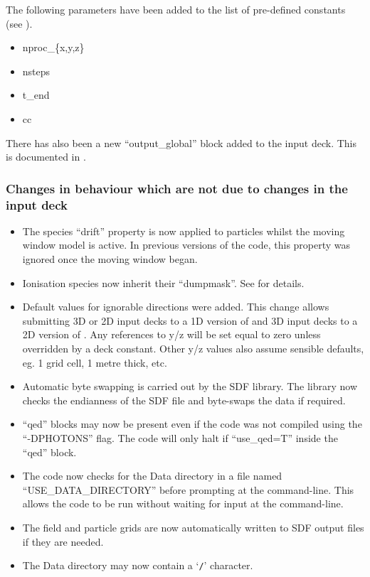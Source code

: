 \noindent The following parameters have been added to the list of pre-defined
constants (see ).
\begin{itemize}
\item nproc\_\{x,y,z\}
\item nsteps
\item t\_end
\item cc
\end{itemize}
\bigskip

\noindent There has also been a new ``output\_global'' block added to the
input deck. This is documented in .

\subsubsection{Changes in behaviour which are not due to changes in the
               input deck}
\begin{itemize}
\item The species ``drift'' property is now applied to particles whilst the
  moving window model is active. In previous versions of the code, this
  property was ignored once the moving window began.
\item Ionisation species now inherit their ``dumpmask''. See 
  for details.
\item Default values for ignorable directions were added.
   This change allows submitting 3D or 2D input decks to a 1D
   version of {\EPOCH} and 3D input decks to a 2D version of {\EPOCH}.
   Any references to y/z will be set equal to zero unless overridden
   by a deck constant. Other y/z values also assume sensible
   defaults, eg. 1 grid cell, 1 metre thick, etc.
\item Automatic byte swapping is carried out by the SDF library.
   The library now checks the endianness of the SDF file and
   byte-swaps the data if required.
\item ``qed'' blocks may now be present even if the code was not compiled
   using the ``-DPHOTONS'' flag.
   The code will only halt if ``use\_qed=T'' inside the ``qed'' block.
\item The code now checks for the Data directory in a file named
   ``USE\_DATA\_DIRECTORY'' before prompting at the command-line. This allows
   the code to be run without waiting for input at the command-line.
\item The field and particle grids are now automatically written to SDF output
   files if they are needed.
\item The Data directory may now contain a `\verb|/|' character.
\end{itemize}


